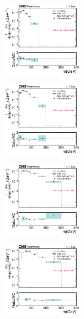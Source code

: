   \begin{figure}[htp!]
    \centering
    \begin{subfigure}
      \centering
      \includegraphics[width=0.45\textwidth]{figures/multijet/unfolding/dijet/binnedResult_ungroomed_0.pdf}
    \end{subfigure}%
    \begin{subfigure}
      \centering
      \includegraphics[width=0.45\textwidth]{figures/multijet/unfolding/dijet/binnedResult_ungroomed_1.pdf}
    \end{subfigure}%
    \begin{subfigure}
      \centering
      \includegraphics[width=0.45\textwidth]{figures/multijet/unfolding/dijet/binnedResult_ungroomed_2.pdf}
    \end{subfigure}%
    \begin{subfigure}
      \centering
      \includegraphics[width=0.45\textwidth]{figures/multijet/unfolding/dijet/binnedResult_ungroomed_3.pdf}

\end{subfigure}
\end{figure}
